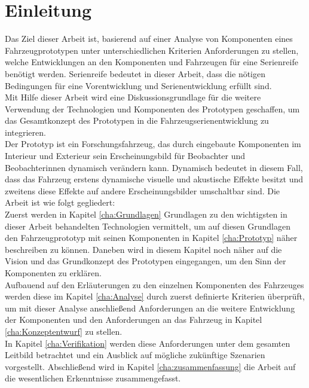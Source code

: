 \chapter{Einleitung}
\label{cha:Einleitung}
Das Ziel dieser Arbeit ist, basierend auf einer Analyse von Komponenten eines Fahrzeugprototypen unter unterschiedlichen Kriterien Anforderungen zu stellen, welche Entwicklungen an den Komponenten und Fahrzeugen für eine Serienreife benötigt werden. Serienreife bedeutet in dieser Arbeit, dass die nötigen Bedingungen für eine Vorentwicklung und Serienentwicklung erfüllt sind.\\
Mit Hilfe dieser Arbeit wird eine Diskussionsgrundlage für die weitere Verwendung der Technologien und Komponenten des Prototypen geschaffen, um das Gesamtkonzept des Prototypen in die Fahrzeugserienentwicklung zu integrieren.\\
Der Prototyp ist ein Forschungsfahrzeug, das durch eingebaute Komponenten im Interieur und Exterieur sein Erscheinungsbild für Beobachter und Beobachterinnen dynamisch verändern kann. Dynamisch bedeutet in diesem Fall, dass das Fahrzeug erstens dynamische visuelle und akustische Effekte besitzt und zweitens diese Effekte auf andere Erscheinungsbilder umschaltbar sind.
Die Arbeit ist wie folgt gegliedert:\\
Zuerst werden in Kapitel \ref{cha:Grundlagen} Grundlagen zu den wichtigsten in dieser Arbeit behandelten Technologien vermittelt, um auf diesen Grundlagen den Fahrzeugprototyp mit seinen Komponenten in Kapitel \ref{cha:Prototyp} näher beschreiben zu können. Daneben wird in diesem Kapitel noch näher auf die Vision und das Grundkonzept des Prototypen eingegangen, um den Sinn der Komponenten zu erklären.\\
Aufbauend auf den Erläuterungen zu den einzelnen Komponenten des Fahrzeuges werden diese im Kapitel \ref{cha:Analyse} durch zuerst definierte Kriterien überprüft, um mit dieser Analyse anschließend Anforderungen an die weitere Entwicklung der Komponenten und den Anforderungen an das Fahrzeug in Kapitel \ref{cha:Konzeptentwurf} zu stellen.\\
In Kapitel \ref{cha:Verifikation} werden diese Anforderungen unter dem gesamten Leitbild betrachtet und ein Ausblick auf mögliche zukünftige Szenarien vorgestellt. Abschließend wird in Kapitel \ref{cha:zusammenfassung} die Arbeit auf die wesentlichen Erkenntnisse zusammengefasst.